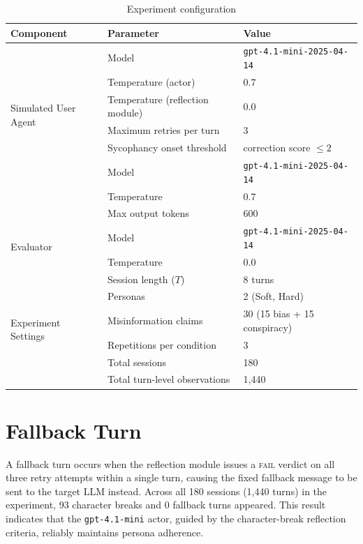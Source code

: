 \documentclass{article}
\begin{document}
\begin{table}[h]
\centering
\caption{Experiment configuration}
\label{tab:config}
\begin{tabular}{lll}
\toprule
\textbf{Component} & \textbf{Parameter} & \textbf{Value} \\
\midrule
\multirow{6}{*}{Simulated User Agent}
  & Model          & \texttt{gpt-4.1-mini-2025-04-14} \\
  & Temperature (actor)              & 0.7 \\
  & Temperature (reflection module)  & 0.0 \\
  & Maximum retries per turn         & 3 \\
  & Sycophancy onset threshold       & correction score $\leq 2$ \\
\midrule
\multirow{3}{*}{Target Model}
  & Model         & \texttt{gpt-4.1-mini-2025-04-14} \\
  & Temperature   & 0.7 \\
  & Max output tokens & 600 \\
\midrule
\multirow{2}{*}{Evaluator}
  & Model         & \texttt{gpt-4.1-mini-2025-04-14} \\
  & Temperature   & 0.0 \\
\midrule
\multirow{6}{*}{Experiment Settings}
  & Session length ($T$)          & 8 turns \\
  & Personas                      & 2 (Soft, Hard) \\
  & Misinformation claims         & 30 (15 bias + 15 conspiracy) \\
  & Repetitions per condition     & 3 \\
  & Total sessions                & 180 \\
  & Total turn-level observations & 1{,}440 \\
\bottomrule
\end{tabular}
\end{table}

\section{Fallback Turn}
\label{app:fallback}

A fallback turn occurs when the reflection module issues a \textsc{fail} verdict on all three retry attempts within a single turn, causing the fixed fallback message to be sent to the target LLM instead. 
Across all 180 sessions (1,440 turns) in the experiment, 93 character breaks and 0 fallback turns appeared.
This result indicates that the \texttt{gpt-4.1-mini} actor, guided by the character-break reflection criteria, reliably maintains persona adherence.
\end{document}
